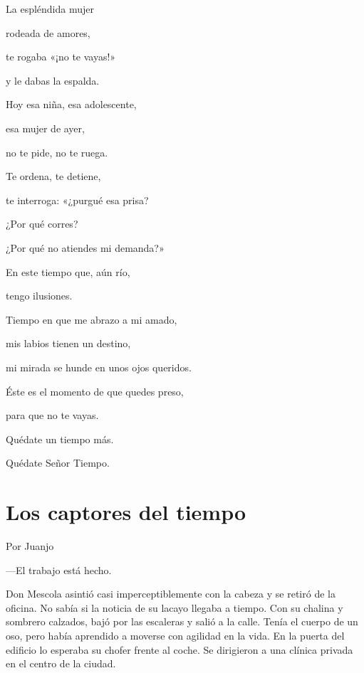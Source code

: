 \documentclass[11pt,twoside,openright,a5paper]{book}
\begin{document}
\begin{center}
La espléndida mujer 

rodeada de amores,

te rogaba «¡no te vayas!»

y le dabas la espalda.

\vspace{0.5cm}

Hoy esa niña, esa adolescente,

esa mujer de ayer,

no te pide, no te ruega.

\vspace{0.5cm}

Te ordena, te detiene, 

te interroga: «¿purgué esa prisa?  

¿Por qué corres?

¿Por qué no atiendes mi demanda?»

\vspace{0.5cm}

En este tiempo que, aún río, 

tengo ilusiones.

Tiempo en que me abrazo a mi amado,

mis labios tienen un destino,

mi mirada se hunde en unos ojos queridos.

\vspace{0.5cm}

Éste es el momento de que quedes preso,

para que no te vayas.

Quédate un tiempo más.

Quédate Señor Tiempo.
\end{center}

\clearpage
\section*{Los captores del tiempo}
                                                                               \begin{flushright}Por Juanjo\end{flushright}

---El trabajo está hecho.

Don Mescola asintió casi imperceptiblemente con la cabeza y se retiró de la oficina. No sabía si la noticia de su lacayo llegaba a tiempo. Con su chalina y sombrero calzados, bajó por las escaleras y salió a la calle. Tenía el cuerpo de un oso, pero había aprendido a moverse con agilidad en la vida. En la puerta del edificio lo esperaba su chofer frente al coche. Se dirigieron a una clínica privada en el centro de la ciudad.
\end{document}
